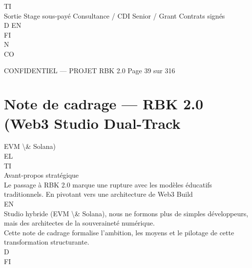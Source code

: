 \documentclass[12pt,landscape,a4paper]{article}
\newenvironment{confidential}
{\begin{tcolorbox}[
    colback=rbkred!5!white,
    colframe=rbkred!75!black,
    title=CONFIDENTIEL,
    fonttitle=\bfseries\color{white},
    coltitle=rbkred!75!black,
    breakable,
    enhanced,
    frame hidden,
    borderline west={2pt}{0pt}{rbkred!75!black}
]}
{\end{tcolorbox}}
\begin{document}
\vspace{0.5em}
\vspace{0.5em}
\vspace{0.5em}
\vspace{0.5em}
TI\\
Sortie        Stage sous-payé                    Consultance / CDI Senior / Grant   Contrats signés\\
\vspace{0.5em}
\vspace{0.5em}
\vspace{0.5em}
\vspace{0.5em}
D   EN\\
FI\\
N\\
CO\\
\vspace{0.5em}
\vspace{0.5em}
\vspace{0.5em}
\vspace{0.5em}
\begin{confidential}CONFIDENTIEL — PROJET RBK 2.0                                  Page 39 sur 316\end{confidential}
\section{Note de cadrage — RBK 2.0 (Web3 Studio Dual-Track}
EVM \textbackslash{}& Solana)\\
\vspace{0.5em}
\vspace{0.5em}
\vspace{0.5em}
\vspace{0.5em}
EL\\
TI\\
Avant-propos stratégique\\
\vspace{0.5em}
Le passage à RBK 2.0 marque une rupture avec les modèles éducatifs traditionnels. En pivotant vers une architecture de Web3 Build\\
\vspace{0.5em}
\vspace{0.5em}
\vspace{0.5em}
\vspace{0.5em}
EN\\
Studio hybride (EVM \textbackslash{}& Solana), nous ne formons plus de simples développeurs, mais des architectes de la souveraineté numérique.\\
Cette note de cadrage formalise l’ambition, les moyens et le pilotage de cette transformation structurante.\\
\vspace{0.5em}
\vspace{0.5em}
\vspace{0.5em}
\vspace{0.5em}
D\\
FI\\
\end{document}
